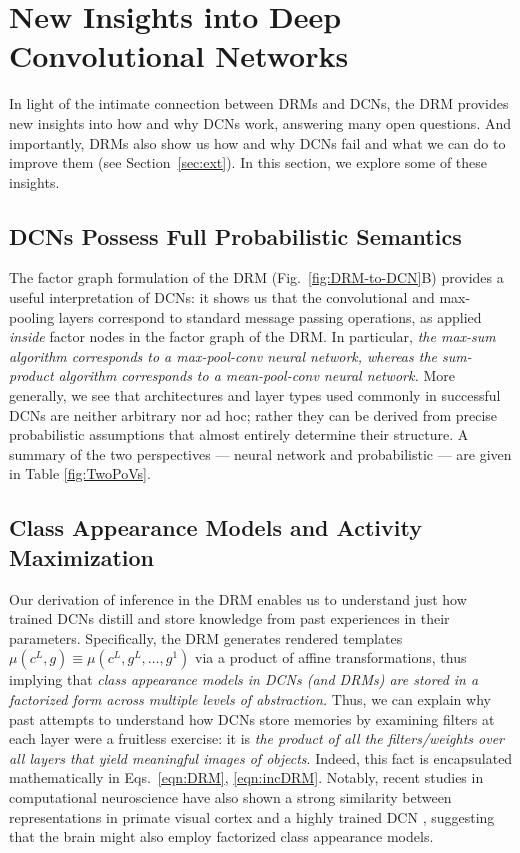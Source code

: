 \documentclass[12pt]{article}
\begin{document}
\section{New Insights into Deep Convolutional Networks}
\label{sec:insights}

In light of the intimate connection between DRMs and DCNs, the DRM provides new insights into how and why DCNs work, answering many open questions. And importantly, DRMs also show us how and why DCNs fail and what we can do to improve them (see Section~\ref{sec:ext}). In this section, we explore some of these insights.

\subsection{DCNs Possess Full Probabilistic Semantics} 

The factor graph formulation of the DRM (Fig.~\ref{fig:DRM-to-DCN}B) provides a useful interpretation of DCNs: it shows us that the convolutional and max-pooling layers correspond to standard message passing operations, as applied \emph{inside} factor nodes in the factor graph of the DRM. 
In particular, \emph{the max-sum algorithm corresponds to a max-pool-conv neural network, whereas the sum-product algorithm corresponds to a mean-pool-conv neural network.} 
More generally, we see that architectures and layer types used commonly in successful DCNs are neither arbitrary nor ad hoc; rather they can be derived from precise probabilistic assumptions that almost entirely determine their structure. 
A summary of the two perspectives --- neural network and probabilistic --- are given in Table \ref{fig:TwoPoVs}.



\subsection{Class Appearance Models and Activity Maximization}

Our derivation of inference in the DRM enables us to understand just how trained DCNs distill and store knowledge from past experiences in their parameters. Specifically, the DRM generates rendered templates $\mu(c^{L}, g) \equiv \mu(c^{L}, g^{L}, \ldots, g^{1})$ via a product of affine transformations, thus implying that \emph{class appearance models in DCNs (and DRMs) are stored in a factorized form across multiple levels of abstraction.} Thus, we can explain why past attempts to understand how DCNs store memories by examining filters at each layer were a fruitless exercise: it is \emph{the product of all the filters/weights over all layers that yield meaningful images of objects}. Indeed, this fact is encapsulated mathematically in Eqs.~\ref{eqn:DRM}, \ref{eqn:incDRM}. Notably, recent studies in computational neuroscience have also shown a strong similarity between representations in primate visual cortex and a highly trained DCN \cite{yamins2014performance}, suggesting that the brain might also employ factorized class appearance models.
\end{document}
